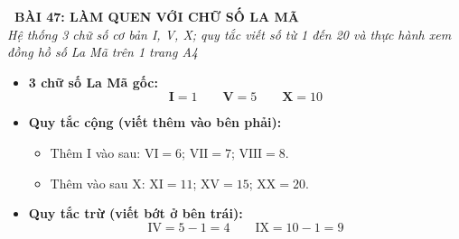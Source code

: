 \documentclass[11pt,a4paper]{article}
\begin{document}
\begin{tcolorbox}[
  enhanced,
  colback=white,
  colframe=primary,
  arc=3mm,
  boxrule=1.2pt,
  left=4mm, right=4mm, top=2.5mm, bottom=2.5mm,
  drop shadow=black!10!white
]
  \centering
  {\Large\bfseries\color{primary}\faBookmark\ BÀI 47: LÀM QUEN VỚI CHỮ SỐ LA MÃ}\\[1.5mm]
  {\small\itshape\color{black!75}Hệ thống 3 chữ số cơ bản I, V, X; quy tắc viết số từ 1 đến 20 và thực hành xem đồng hồ số La Mã trên 1 trang A4}
\end{tcolorbox}

\vspace{-2mm}


\noindent
\begin{minipage}[t]{0.49\textwidth}\vspace{0pt}
\begin{tcolorbox}[
  enhanced,
  colback=blue!4!white,
  colframe=blue!75!black,
  arc=2mm, boxrule=0.8pt,
  left=2mm, right=2mm, top=1.8mm, bottom=1.8mm,
  title={\footnotesize\bfseries\color{white}\faKey\ 1. Ba chữ số cơ bản và quy tắc ghép}
]
{\footnotesize
\begin{itemize}\setlength{\itemsep}{1.5pt}\setlength{\leftskip}{-2.5mm}
  \item \textbf{3 chữ số La Mã gốc:}
  $$\mathbf{I} = 1 \qquad \mathbf{V} = 5 \qquad \mathbf{X} = 10$$
  \item \textbf{Quy tắc cộng (viết thêm vào bên phải):}
  \begin{itemize}\setlength{\itemsep}{0.5pt}\setlength{\leftskip}{-2.5mm}
    \item Thêm $\text{I}$ vào sau: $\text{VI} = 6$; $\text{VII} = 7$; $\text{VIII} = 8$.
    \item Thêm vào sau $\text{X}$: $\text{XI} = 11$; $\text{XV} = 15$; $\text{XX} = 20$.
  \end{itemize}
  \item \textbf{Quy tắc trừ (viết bớt ở bên trái):}
  $$\text{IV} = 5 - 1 = 4 \qquad \text{IX} = 10 - 1 = 9$$
\end{itemize}
}
\end{tcolorbox}
\end{minipage}
\hfill
\end{document}
